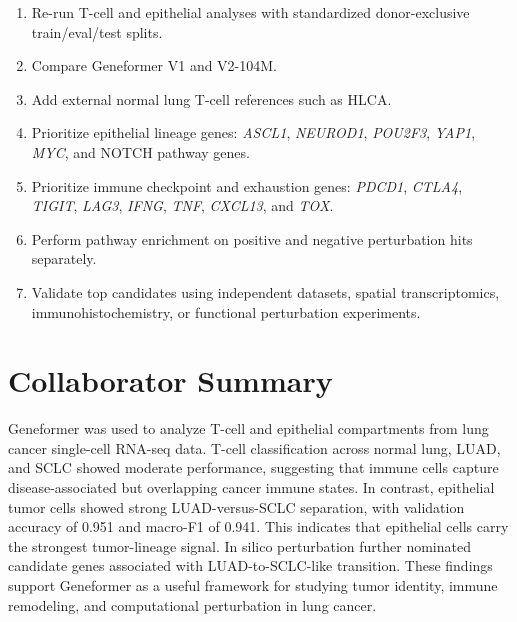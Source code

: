 \documentclass[11pt,a4paper]{article}
\begin{document}
\begin{enumerate}[leftmargin=*]
    \item Re-run T-cell and epithelial analyses with standardized donor-exclusive train/eval/test splits.
    \item Compare Geneformer V1 and V2-104M.
    \item Add external normal lung T-cell references such as HLCA.
    \item Prioritize epithelial lineage genes: \textit{ASCL1}, \textit{NEUROD1}, \textit{POU2F3}, \textit{YAP1}, \textit{MYC}, and NOTCH pathway genes.
    \item Prioritize immune checkpoint and exhaustion genes: \textit{PDCD1}, \textit{CTLA4}, \textit{TIGIT}, \textit{LAG3}, \textit{IFNG}, \textit{TNF}, \textit{CXCL13}, and \textit{TOX}.
    \item Perform pathway enrichment on positive and negative perturbation hits separately.
    \item Validate top candidates using independent datasets, spatial transcriptomics, immunohistochemistry, or functional perturbation experiments.
\end{enumerate}

\section{Collaborator Summary}

Geneformer was used to analyze T-cell and epithelial compartments from lung cancer single-cell RNA-seq data. T-cell classification across normal lung, LUAD, and SCLC showed moderate performance, suggesting that immune cells capture disease-associated but overlapping cancer immune states. In contrast, epithelial tumor cells showed strong LUAD-versus-SCLC separation, with validation accuracy of 0.951 and macro-F1 of 0.941. This indicates that epithelial cells carry the strongest tumor-lineage signal. In silico perturbation further nominated candidate genes associated with LUAD-to-SCLC-like transition. These findings support Geneformer as a useful framework for studying tumor identity, immune remodeling, and computational perturbation in lung cancer.
\end{document}

